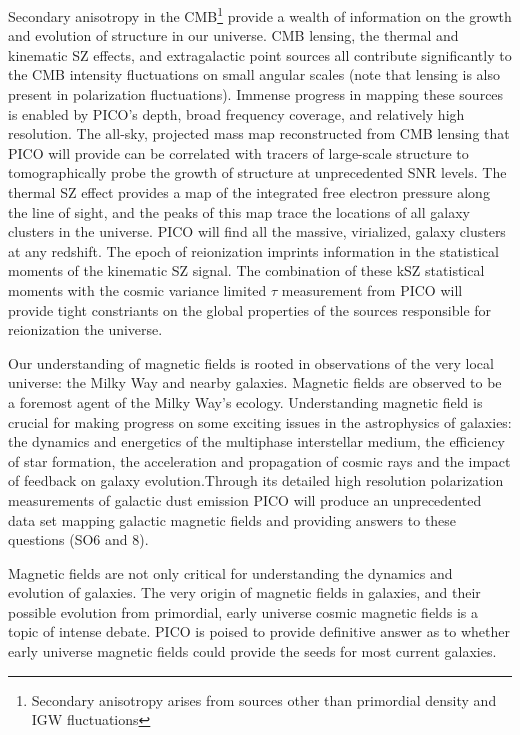 \documentclass[PICOReport.tex]{subfiles}
\begin{document}
Secondary anisotropy in the CMB\footnote{Secondary anisotropy arises from sources other than primordial density and \ac{IGW} fluctuations} provide a wealth of information on the growth and evolution of structure in our universe. CMB lensing, the thermal and kinematic \ac{SZ} effects, and extragalactic point sources all contribute significantly to the CMB intensity fluctuations on small angular scales (note that lensing is also present in polarization fluctuations). Immense progress in mapping these sources is enabled by PICO's depth, broad frequency coverage, and relatively high resolution. The all-sky, projected mass map reconstructed from CMB lensing that PICO will provide can be correlated with tracers of large-scale structure to tomographically probe the growth of structure at unprecedented \ac{SNR} levels. The thermal SZ effect provides a map of the integrated free electron pressure along the line of sight, and the peaks of this map trace the locations of all galaxy clusters in the universe. PICO will find all the massive, virialized, galaxy clusters at any redshift.  The epoch of reionization imprints information in the statistical moments of the kinematic SZ signal. The combination of these kSZ statistical moments with the cosmic variance limited $\tau$ measurement from PICO will provide tight constriants on the global properties of the sources responsible for reionization the universe.

Our understanding of magnetic fields is rooted in observations of the very local universe: the Milky Way and nearby galaxies. Magnetic fields are observed to be a foremost agent of the Milky Way's ecology. Understanding magnetic field is crucial for making progress on some exciting issues in the astrophysics of galaxies: the dynamics and energetics of the multiphase interstellar medium, the efficiency of star formation, the acceleration and propagation of cosmic rays and the 
impact of feedback on galaxy evolution.Through its detailed high resolution polarization measurements of galactic dust emission PICO will produce an unprecedented data set mapping galactic magnetic fields and providing answers to these questions (SO6 and 8). 

Magnetic fields are not only critical for understanding the dynamics and evolution of galaxies. The very origin of magnetic fields in galaxies, and their possible evolution from primordial, early universe cosmic magnetic fields is a topic of intense debate. PICO is poised to provide definitive answer as to whether early universe magnetic fields could provide the seeds for most current galaxies. 
\end{document}
